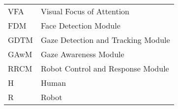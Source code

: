 \begin{longtable}{p{3cm}p{10cm}}
VFA& Visual Focus of Attention\\
FDM&Face Detection Module\\
GDTM&Gaze Detection and Tracking Module\\
GAwM&Gaze Awareness Module\\
RRCM&Robot Control and Response Module\\
H& Human\\
R& Robot\\
\end{longtable}
\addtocounter{table}{-1} 